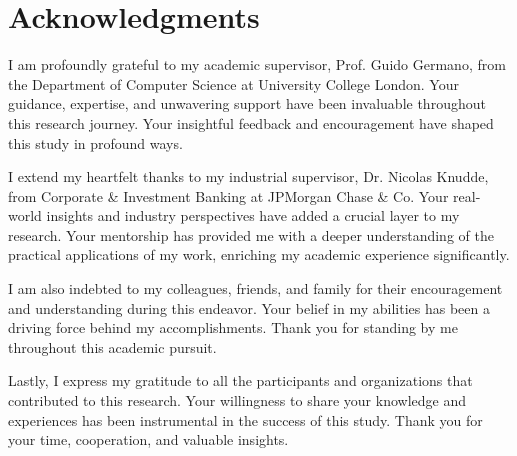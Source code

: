 \section*{Acknowledgments}
I am profoundly grateful to my academic supervisor, Prof. Guido Germano, from the Department of Computer Science at University College London. Your guidance, expertise, and unwavering support have been invaluable throughout this research journey. Your insightful feedback and encouragement have shaped this study in profound ways.

I extend my heartfelt thanks to my industrial supervisor, Dr. Nicolas Knudde, from Corporate \& Investment Banking at JPMorgan Chase \& Co. Your real-world insights and industry perspectives have added a crucial layer to my research. Your mentorship has provided me with a deeper understanding of the practical applications of my work, enriching my academic experience significantly.

I am also indebted to my colleagues, friends, and family for their encouragement and understanding during this endeavor. Your belief in my abilities has been a driving force behind my accomplishments. Thank you for standing by me throughout this academic pursuit.

Lastly, I express my gratitude to all the participants and organizations that contributed to this research. Your willingness to share your knowledge and experiences has been instrumental in the success of this study. Thank you for your time, cooperation, and valuable insights.